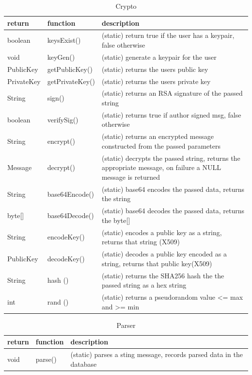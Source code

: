 \begin{table}[h]
    \centering
    \begin{tabular}{p{1.4cm}p{3.3cm}p{9cm}}
    return     & function        & description\\ \hline
    boolean    & keysExist()     & (static) return true if the user has a keypair, false otherwise\\
    void       & keyGen()        & (static) generate a keypair for the user\\
    PublicKey  & getPublicKey()  & (static) returns the users public key\\
    PrivateKey & getPrivateKey() & (static) returns the users private key\\

    String     & sign()      & (static) returns an RSA signature of the passed string\\
    boolean    & verifySig() & (static) returns true if author signed msg, false otherwise\\
    String     & encrypt()   & (static) returns an encrypted message constructed from the passed parameters\\
    Message    & decrypt()   & (static) decrypts the passed string, returns the appropriate message, on failure a NULL message is returned\\
    String    & base64Encode() & (static) base64 encodes the passed data, returns the string\\
    byte[]    & base64Decode() & (static) base64 decodes the passed data, returns the byte[]\\
    String    & encodeKey()    & (static) encodes a public key as a string, returns that string (X509)\\
    PublicKey & decodeKey()    & (static) decodes a public key encoded as a string, returns that public key(X509)\\
    String    & hash ()        & (static) returns the SHA256 hash the the passed string as a hex string\\
    int       & rand ()        & (static) returns a pseudorandom value <= max and >= min\\
    \end{tabular}
    \caption{Crypto}
\end{table}

\begin{table}[h]
    \centering
    \begin{tabular}{p{1cm}p{2.6cm}p{9cm}}
    return & function & description\\ \hline
    void   & parse()  & (static) parses a sting message, records parsed data in the database\\
    \end{tabular}
    \caption{Parser}
\end{table}

